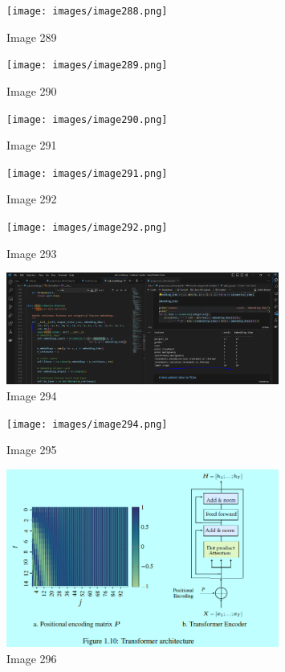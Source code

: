 \documentclass{article}%
\begin{document}
%


\begin{figure}[h!]%
\centering%
\texttt{[image: images/image288.png]}%
\caption{Image 289}%
\end{figure}

%


\begin{figure}[h!]%
\centering%
\texttt{[image: images/image289.png]}%
\caption{Image 290}%
\end{figure}

%


\begin{figure}[h!]%
\centering%
\texttt{[image: images/image290.png]}%
\caption{Image 291}%
\end{figure}

%


\begin{figure}[h!]%
\centering%
\texttt{[image: images/image291.png]}%
\caption{Image 292}%
\end{figure}

%


\begin{figure}[h!]%
\centering%
\texttt{[image: images/image292.png]}%
\caption{Image 293}%
\end{figure}

%


\begin{figure}[h!]%
\centering%
\includegraphics[width=0.8\textwidth]{images/image293.png}%
\caption{Image 294}%
\end{figure}

%


\begin{figure}[h!]%
\centering%
\texttt{[image: images/image294.png]}%
\caption{Image 295}%
\end{figure}

%


\begin{figure}[h!]%
\centering%
\includegraphics[width=0.8\textwidth]{images/image295.png}%
\caption{Image 296}%
\end{figure}
\end{document}
